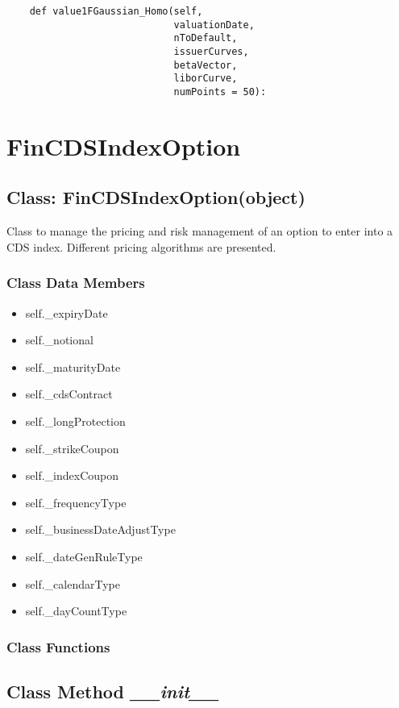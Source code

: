 \documentclass[twoside,11pt]{book}
\begin{document}
\begin{lstlisting}
    def value1FGaussian_Homo(self, 
                             valuationDate,
                             nToDefault,
                             issuerCurves, 
                             betaVector, 
                             liborCurve,
                             numPoints = 50):
\end{lstlisting}

\newpage
\section{FinCDSIndexOption}

\subsection{Class: FinCDSIndexOption(object)}
Class to manage the pricing and risk management of an option to enter into a CDS index. Different pricing algorithms are presented. 

\subsubsection{Class Data Members}
\begin{itemize}
\item{self.\_expiryDate}
\item{self.\_notional}
\item{self.\_maturityDate}
\item{self.\_cdsContract}
\item{self.\_longProtection}
\item{self.\_strikeCoupon}
\item{self.\_indexCoupon}
\item{self.\_frequencyType}
\item{self.\_businessDateAdjustType}
\item{self.\_dateGenRuleType}
\item{self.\_calendarType}
\item{self.\_dayCountType}
\end{itemize}

\subsubsection{Class Functions}

\subsection{Class Method {\it \_\_init\_\_}}
\end{document}
